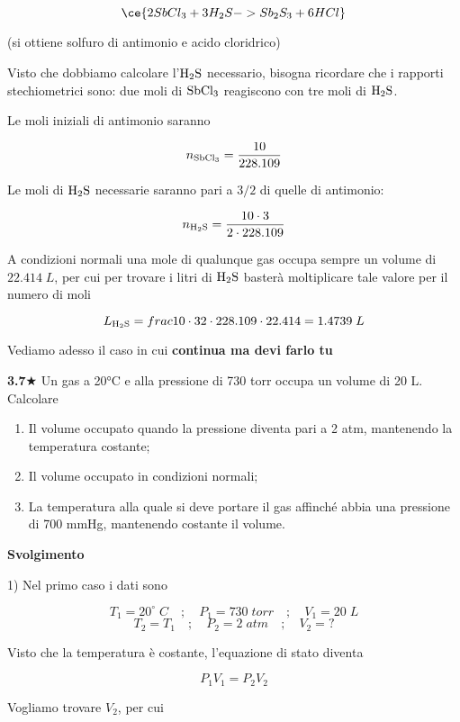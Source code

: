 $$\ce{2SbCl_3 + 3H_2S -> Sb_2S_3 + 6HCl}$$

(si ottiene solfuro di antimonio e acido cloridrico)

Visto che dobbiamo calcolare l'$\rm H_2S$ necessario, bisogna ricordare che i rapporti stechiometrici sono: due moli di $\rm SbCl_3$ reagiscono con tre moli di $\rm H_2S$.

Le moli iniziali di antimonio saranno

$$n_{\rm SbCl_3}=\frac{10}{228.109}$$

Le moli di $\rm H_2S$ necessarie saranno pari a $3/2$ di quelle di antimonio:

$$n_{\rm H_2S}=\frac{10 \cdot 3}{2 \cdot 228.109}$$

A condizioni normali una mole di qualunque gas occupa sempre un volume di $22.414\;L$, per cui per trovare i litri di $\rm H_2S$ basterà moltiplicare tale valore per il numero di moli

$$L_{\rm H_2S}=frac{10 \cdot 3}{2 \cdot 228.109} \cdot 22.414
=1.4739\;L$$

Vediamo adesso il caso in cui \textbf{continua ma devi farlo tu}

\vspace{0.2cm}\textbf{3.7}$\bigstar$ Un gas a 20°C e alla pressione di 730 torr occupa un volume di 20 L. Calcolare

\begin{enumerate}
    \item Il volume occupato quando la pressione diventa pari a 2 atm, mantenendo la temperatura costante;
    \item Il volume occupato in condizioni normali;
    \item La temperatura alla quale si deve portare il gas affinché abbia una pressione di 700 mmHg, mantenendo costante il volume.
\end{enumerate}

\vspace{0.2cm}\large\textbf{Svolgimento}\normalsize

\vspace{0.2cm} 1) Nel primo caso i dati sono

$$T_1=20^{\circ}\;C
\quad;\quad
P_1=730\;torr
\quad;\quad
V_1=20\;L$$
$$T_2=T_1
\quad;\quad
P_2=2\;atm
\quad;\quad
V_2=?$$

Visto che la temperatura è costante, l'equazione di stato diventa

$$P_1V_1=P_2V_2$$

Vogliamo trovare $V_2$, per cui

